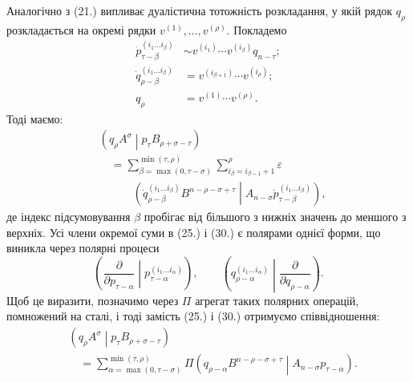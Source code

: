 \documentclass[11pt]{article}
\newcommand{\pair}[2]{\left(#1\middle|#2\right)}
\newcommand{\eps}{\varepsilon}
\begin{document}
Аналогічно з (21.) випливає дуалістична тотожність розкладання, у якій рядок $q_\rho$ розкладається на окремі рядки $v^{(1)},\ldots,v^{(\rho)}$. Покладемо
\begin{equation}
\begin{aligned}
 \dot p_{\tau-\beta}^{(i_1\ldots i_\beta)}
&\sim v^{(i_1)}\cdots v^{(i_\beta)}q_{n-\tau};\\
 \dot q_{\rho-\beta}^{(i_1\ldots i_\beta)}
&=v^{(i_{\beta+1})}\cdots v^{(i_\rho)};\\
 q_\rho&=v^{(1)}\cdots v^{(\rho)}.
\end{aligned}
\tag{29}
\end{equation}
Тоді маємо:
\begin{equation}
\begin{aligned}
&\pair{q_\rho A^\sigma}{p_\tau B_{\rho+\sigma-\tau}}\\
&\quad=\sum_{\beta=\max(0,\tau-\sigma)}^{\min(\tau,\rho)}
\sum_{i_\beta=i_{\beta-1}+1}^{\rho}\eps\\
&\qquad\quad\pair{\dot q_{\rho-\beta}^{(i_1\ldots i_\beta)}
B^{n-\rho-\sigma+\tau}}
{A_{n-\sigma}\dot p_{\tau-\beta}^{(i_1\ldots i_\beta)}} ,
\end{aligned}
\tag{30}
\end{equation}
де індекс підсумовування $\beta$ пробігає від більшого з нижніх значень до меншого з верхніх. Усі члени окремої суми в (25.) і (30.) є полярами однієї форми, що виникла через полярні процеси
\[
\left(\frac{\partial}{\partial p_{\tau-\alpha}}\middle|
p_{\tau-\alpha}^{(i_1\ldots i_\alpha)}\right),\qquad
\left(q_{\rho-\alpha}^{(i_1\ldots i_\alpha)}\middle|
\frac{\partial}{\partial q_{\rho-\alpha}}\right).
\]
Щоб це виразити, позначимо через $\Pi$ агрегат таких полярних операцій, помножений на сталі, і тоді замість (25.) і (30.) отримуємо співвідношення:
\begin{equation}
\begin{aligned}
&\pair{q_\rho A^\sigma}{p_\tau B_{\rho+\sigma-\tau}}\\
&\quad=\sum_{\alpha=\max(0,\tau-\sigma)}^{\min(\tau,\rho)}
\Pi\pair{q_{\rho-\alpha}B^{n-\rho-\sigma+\tau}}
{A_{n-\sigma}p_{\tau-\alpha}}.
\end{aligned}
\tag{31}
\end{equation}
\end{document}
